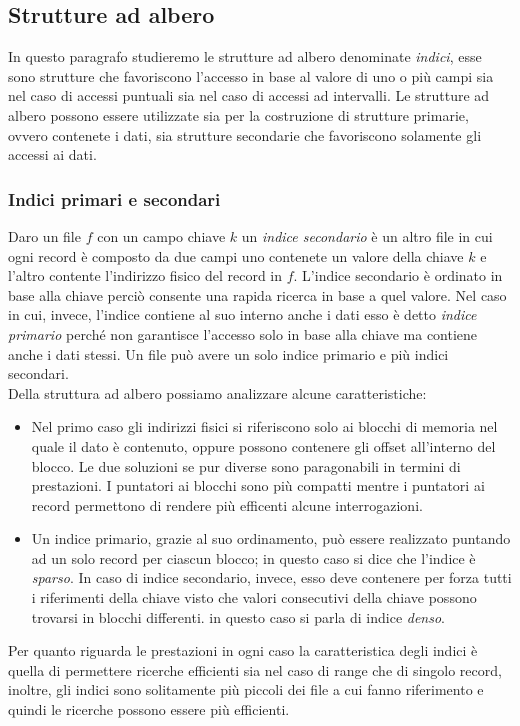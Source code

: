 \subsection{Strutture ad albero}
In questo paragrafo studieremo le strutture ad albero denominate \emph{indici}, esse sono strutture che favoriscono l'accesso in base al valore di uno o più campi sia nel caso di accessi puntuali sia nel caso di accessi ad intervalli. Le strutture ad albero possono essere utilizzate sia per la costruzione di strutture primarie, ovvero contenete i dati, sia strutture secondarie che favoriscono solamente gli accessi ai dati.\\
\subsubsection{Indici primari e secondari}
Daro un file $f$ con un campo chiave $k$ un \emph{indice secondario} è un altro file in cui ogni record è composto da due campi uno contenete un valore della chiave $k$ e l'altro contente l'indirizzo fisico del record in $f$. L'indice secondario è ordinato in base alla chiave perciò consente una rapida ricerca in base a quel valore. Nel caso in cui, invece, l'indice contiene al suo interno anche i dati esso è detto \emph{indice primario} perché non garantisce l'accesso solo in base alla chiave ma contiene anche i dati stessi. Un file può avere un solo indice primario e più indici secondari.\\
Della struttura ad albero possiamo analizzare alcune caratteristiche:
\begin{itemize}
  \item Nel primo caso gli indirizzi fisici si riferiscono solo ai blocchi di memoria nel quale il dato è contenuto, oppure possono contenere gli offset all'interno del blocco. Le due soluzioni se pur diverse sono paragonabili in termini di prestazioni. I puntatori ai blocchi sono più compatti mentre i puntatori ai record permettono di rendere più efficenti alcune interrogazioni.
  \item Un indice primario, grazie al suo ordinamento, può essere realizzato puntando ad un solo record per ciascun blocco; in questo caso si dice che l'indice è \emph{sparso}. In caso di indice secondario, invece, esso deve contenere per forza tutti i riferimenti della chiave visto che valori consecutivi della chiave possono trovarsi in blocchi differenti. in questo caso si parla di indice \emph{denso}.
\end{itemize}
Per quanto riguarda le prestazioni in ogni caso la caratteristica degli indici è quella di permettere ricerche efficienti sia nel caso di range che di singolo record, inoltre, gli indici sono solitamente più piccoli dei file a cui fanno riferimento e quindi le ricerche possono essere più efficienti.

